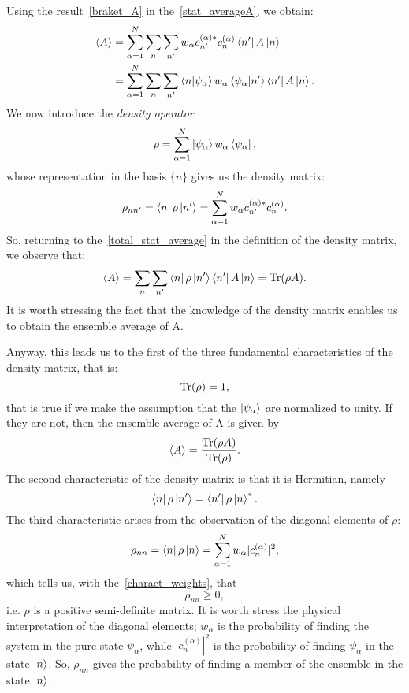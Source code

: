 Using the result~\ref{braket_A} in the~\ref{stat_averageA}, we obtain:
\begin{align}
    \braket{A} &= \sum_{\alpha = 1}^N \sum_n \sum_{n'} w_\alpha c_{n'}^{(\alpha)*} c_n^{(\alpha)} \bra{n'}A\ket{n} \\
                \label{total_stat_average}
               &= \sum_{\alpha = 1}^N \sum_n \sum_{n'} \braket{n|\psi_\alpha}w_\alpha \braket{\psi_\alpha|n'} \bra{n'}A\ket{n}.
\end{align}
We now introduce the \emph{density operator}
\begin{equation}
    \rho = \sum_{\alpha = 1}^N \ket{\psi_\alpha} w_\alpha \bra{\psi_\alpha},
\end{equation}
whose representation in the basis $\{n\}$ gives us the density matrix:
\begin{equation}
    \rho_{nn'} = \bra{n}\rho\ket{n'} = \sum_{\alpha = 1}^N w_\alpha c_{n'}^{(\alpha)*} c_n^{(\alpha)}.
\end{equation}
So, returning to the~\ref{total_stat_average} in the definition of the density matrix, we observe that:
\begin{equation*}
    \braket{A} = \sum_n \sum_{n'} \bra{n}\rho\ket{n'}\bra{n'}A\ket{n} = \operatorname{Tr}({\rho A}).
\end{equation*}
It is worth stressing the fact that the knowledge of the density matrix enables us to obtain the ensemble average of A.

Anyway, this leads us to the first of the three fundamental characteristics of the density matrix, that is:
\begin{equation}
    \operatorname{Tr}(\rho) = 1,
\end{equation}
that is true if we make the assumption that the $\ket{\psi_\alpha}$ are normalized to unity. If they are not, then the ensemble average of A is given by
\begin{equation}
    \braket{A} = \frac{\operatorname{Tr}(\rho A)}{\operatorname{Tr}(\rho)}.
\end{equation}
The second characteristic of the density matrix is that it is Hermitian, namely
\begin{equation}
    \bra{n}\rho\ket{n'} = \bra{n'}\rho\ket{n}^*.
\end{equation}
The third characteristic arises from the observation of the diagonal elements of $\rho$:
\begin{equation}
    \rho_{nn} = \bra{n}\rho\ket{n} = \sum_{\alpha = 1}^N w_\alpha |c_{n}^{(\alpha)}|^2,
\end{equation}
which tells us, with the~\ref{charact_weights}, that
\begin{equation}
    \rho_{nn} \geq 0,
\end{equation}
i.e. $\rho$ is a positive semi-definite matrix.
It is worth stress the physical interpretation of the diagonal elements; $w_\alpha$ is the probability of finding the system in the pure state $\psi_\alpha$, while $|c_{n}^{(\alpha)}|^2$ is the probability of finding $\psi_\alpha$ in the state $\ket{n}$. So, $\rho_{nn}$ gives the probability of finding a member of the ensemble in the state $\ket{n}$.

